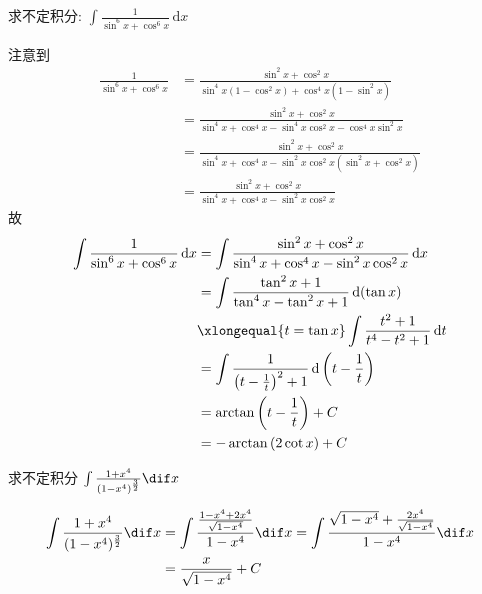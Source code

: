 \documentclass[color=green,titlestyle=hang]{elegantbook}%
\begin{document}
\begin{exercise}
求不定积分: $\int\frac{1}{\sin^6x+\cos^6x}\,\mathrm{d}x$
\end{exercise}\begin{Solution} 
注意到\begin{align*}
\frac{1}{\sin^6x+\cos^6x}&=\frac{\sin^2x+\cos^2x}{\sin^4x(1-\cos^2x)+\cos^4x(1-\sin^2x)}\\
&=\frac{\sin^2x+\cos^2x}{\sin^4x+\cos^4x-\sin^4x\cos^2x-\cos^4x\sin^2x}\\
&=\frac{\sin^2x+\cos^2x}{\sin^4x+\cos^4x-\sin^2x\cos^2x(\sin^2x+\cos^2x)}\\
&=\frac{\sin^2x+\cos^2x}{\sin^4x+\cos^4x-\sin^2x\cos^2x}
\end{align*}
故\begin{align*}
\int\frac{1}{\sin^6x+\cos^6x}\,\mathrm{d}x&=\int\frac{\sin^2x+\cos^2x}{\sin^4x+\cos^4x-\sin^2x\cos^2x}\,\mathrm{d}x\\
&=\int\frac{\tan^2x+1}{\tan^4x-\tan^2x+1}\,\mathrm{d}(\tan x)\\
&\xlongequal{t=\tan x}\int\frac{t^2+1}{t^4-t^2+1}\,\mathrm{d}t\\
&=\int\frac{1}{\left(t-\frac{1}{t}\right)^2+1}\,\mathrm{d}\left(t-\frac{1}{t}\right)\\
&=\arctan\left(t-\frac{1}{t}\right)+C\\
&=-\arctan\left(2\cot x\right)+C
\end{align*}	
\end{Solution}

\begin{example}
求不定积分 $\int\frac{1+x^4}{(1-x^4)^{\frac{3}{2}}}\dif x$
\end{example}\begin{solution}
\begin{align*}
\int\frac{1+x^4}{(1-x^4)^{\frac{3}{2}}}\dif x
&=\int\frac{\frac{1-x^4+2x^4}{\sqrt{1-x^4}}}{1-x^4}\dif x=\int\frac{\sqrt{1-x^4}+\frac{2x^4}{\sqrt{1-x^4}}}{1-x^4}\dif x\\
&=\frac{x}{\sqrt{1-x^4}}+C
\end{align*}
\end{solution}
\end{document}
